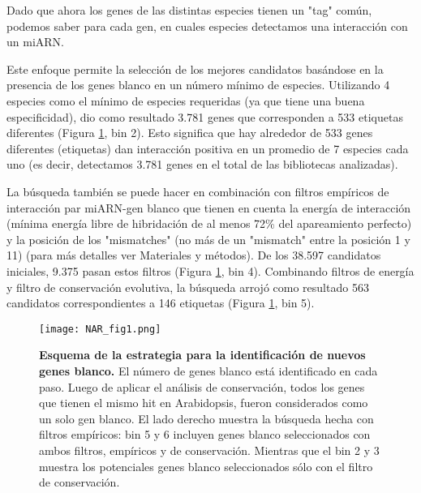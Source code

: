 Dado que ahora los genes de las distintas especies tienen un "tag" común, podemos saber para cada gen, en cuales especies detectamos una interacción con un miARN.

Este enfoque permite la selección de los mejores candidatos basándose en la presencia de los genes blanco en un número mínimo de especies.
Utilizando 4 especies como el mínimo de especies requeridas (ya que tiene una buena especificidad), dio como resultado 3.781 genes que corresponden a 533 etiquetas diferentes (Figura \ref{fig:NAR_fig1}, bin 2).
Esto significa que hay alrededor de 533 genes diferentes (etiquetas) dan interacción positiva en un promedio de 7 especies cada uno (es decir, detectamos 3.781 genes en el total de las bibliotecas analizadas).

La búsqueda también se puede hacer en combinación con filtros empíricos de interacción par miARN-gen blanco que tienen en cuenta la energía de interacción (mínima energía libre de hibridación de al menos 72\% del apareamiento perfecto) y la posición de los "mismatches" (no más de un "mismatch" entre la posición 1 y 11) (para más detalles ver Materiales y métodos).
De los 38.597 candidatos iniciales, 9.375 pasan estos filtros (Figura \ref{fig:NAR_fig1}, bin 4).
Combinando filtros de energía y filtro de conservación evolutiva, la búsqueda arrojó como resultado 563 candidatos correspondientes a 146 etiquetas (Figura \ref{fig:NAR_fig1}, bin 5).


\begin{figure}[htbp!] 
    \centering    
    \texttt{[image: NAR\_fig1.png]}
    \caption[Estrategia]{
    \textbf{Esquema de la estrategia para la identificación de nuevos genes blanco.}
    El número de genes blanco está identificado en cada paso. 
    Luego de aplicar el análisis de conservación, todos los genes que tienen el mismo hit en Arabidopsis, fueron considerados como un solo gen blanco. 
    El lado derecho muestra la búsqueda hecha con filtros empíricos: bin 5 y 6 incluyen genes blanco seleccionados con ambos filtros, empíricos y de conservación.
    Mientras que el bin 2 y 3 muestra los potenciales genes blanco seleccionados sólo con el filtro de conservación.}
    \label{fig:NAR_fig1}
\end{figure}

